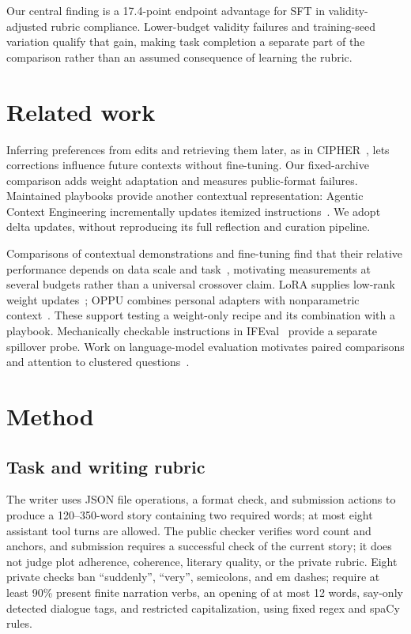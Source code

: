 \documentclass[10pt,twocolumn,letterpaper]{article}
\newcommand{\claim}[2]{#2}
\begin{document}
\claim{C18}{Our central finding is a 17.4-point endpoint advantage for SFT in validity-adjusted rubric compliance. Lower-budget validity failures and training-seed variation qualify that gain, making task completion a separate part of the comparison rather than an assumed consequence of learning the rubric.}

\section{Related work}
\claim{C20}{Inferring preferences from edits and retrieving them later, as in CIPHER~\cite{cipher}, lets corrections influence future contexts without fine-tuning. Our fixed-archive comparison adds weight adaptation and measures public-format failures.}
\claim{C21}{Maintained playbooks provide another contextual representation: Agentic Context Engineering incrementally updates itemized instructions~\cite{ace}. We adopt delta updates, without reproducing its full reflection and curation pipeline.}

\claim{C22}{Comparisons of contextual demonstrations and fine-tuning find that their relative performance depends on data scale and task~\cite{bertsch}, motivating measurements at several budgets rather than a universal crossover claim.}
\claim{C23}{LoRA supplies low-rank weight updates~\cite{lora}; OPPU combines personal adapters with nonparametric context~\cite{oppu}. These support testing a weight-only recipe and its combination with a playbook.}
\claim{C24}{Mechanically checkable instructions in IFEval~\cite{ifeval} provide a separate spillover probe. Work on language-model evaluation motivates paired comparisons and attention to clustered questions~\cite{miller}.}

\section{Method}
\subsection{Task and writing rubric}
\claim{C32}{The writer uses JSON file operations, a format check, and submission actions to produce a 120--350-word story containing two required words; at most eight assistant tool turns are allowed.}
\claim{C33}{The public checker verifies word count and anchors, and submission requires a successful check of the current story; it does not judge plot adherence, coherence, literary quality, or the private rubric.}
\claim{C34}{Eight private checks ban ``suddenly'', ``very'', semicolons, and em dashes; require at least 90\% present finite narration verbs, an opening of at most 12 words, say-only detected dialogue tags, and restricted capitalization, using fixed regex and spaCy rules.}
\end{document}
